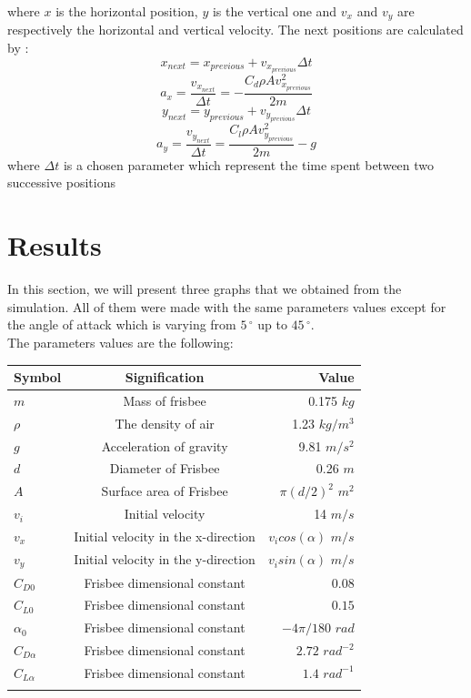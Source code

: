 \documentclass[10pt,a4paper]{report}
\begin{document}
where $x$ is the horizontal position, $y$ is the vertical one and $v_x$ and $v_y$ are respectively the horizontal and vertical velocity.
The next positions are calculated by :
\[x_{next} = x_{previous} + v_{x_{previous}} \Delta t \]
\[a_x=\frac{v_{x_{next}}}{\Delta t} = -\frac{C_d \rho A  v_{x_{previous}}^2}{2m}\]
\[y_{next} = y_{previous} + v_{y_{previous}} \Delta t \]
\[a_y = \frac{v_{y_{next}}}{\Delta t} = \frac{C_l \rho A  v_{y_{previous}}^2}{2m} - g\]
\cite{art5}
where $\Delta t$ is a chosen parameter which represent the time spent between two successive positions
\section{Results}
In this section, we will present three graphs that we obtained from the simulation. All of them were made with the same parameters values except for the angle of attack which is varying from $5\,^{\circ}$ up to $45\,^{\circ} $. 
\\The parameters values are the following:
\\
\begin{center}
\begin{tabular}{|l|c|r|}
  \hline
  Symbol & Signification & Value \\
  \hline
  $m$ & Mass of frisbee & 0.175 $kg$\\
  $\rho$ & The density of air & 1.23 $kg/m^3$\\
  $g$ & Acceleration of gravity & 9.81 $m/s^2$ \\
  $d$ & Diameter of Frisbee & 0.26 $m$ \\
  $A$ & Surface area of Frisbee & $\pi (d/2)^2$ $m^2$ \\
  $v_i$ & Initial velocity & 14 $m/s$ \\
  $v_x$ & Initial velocity in the x-direction & $v_icos(\alpha)$ $m/s$ \\
  $v_y$ & Initial velocity in the y-direction & $v_isin(\alpha)$ $m/s$ \\
  $C_{D0}$ & Frisbee dimensional constant & $0.08$ \\
  $C_{L0}$ & Frisbee dimensional constant & $0.15$ \\
  $\alpha_0$ & Frisbee dimensional constant & $-4\pi / 180$ $rad$ \\
  $C_{D\alpha}$ & Frisbee dimensional constant & $2.72$ $rad^{-2}$\\
  $C_{L\alpha}$ & Frisbee dimensional constant & $1.4 $ $rad^{-1}$\\
  \\
  \hline
\end{tabular}
\end{center}
\end{document}
